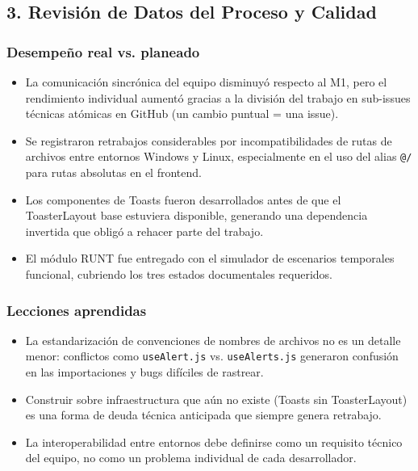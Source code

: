 \documentclass[11pt,a4paper]{article}
\begin{document}
\subsection{3. Revisión de Datos del Proceso y Calidad}

\subsubsection{Desempeño real vs. planeado}

\begin{itemize}[leftmargin=1.2em]
\item La comunicación sincrónica del equipo disminuyó respecto al M1, pero el rendimiento individual aumentó gracias a la división del trabajo en sub-issues técnicas atómicas en GitHub (un cambio puntual = una issue).
\item Se registraron retrabajos considerables por incompatibilidades de rutas de archivos entre entornos Windows y Linux, especialmente en el uso del alias \texttt{@/} para rutas absolutas en el frontend.
\item Los componentes de Toasts fueron desarrollados antes de que el ToasterLayout base estuviera disponible, generando una dependencia invertida que obligó a rehacer parte del trabajo.
\item El módulo RUNT fue entregado con el simulador de escenarios temporales funcional, cubriendo los tres estados documentales requeridos.
\end{itemize}

\subsubsection{Lecciones aprendidas}

\begin{itemize}[leftmargin=1.2em]
\item La estandarización de convenciones de nombres de archivos no es un detalle menor: conflictos como \texttt{useAlert.js} vs. \texttt{useAlerts.js} generaron confusión en las importaciones y bugs difíciles de rastrear.
\item Construir sobre infraestructura que aún no existe (Toasts sin ToasterLayout) es una forma de deuda técnica anticipada que siempre genera retrabajo.
\item La interoperabilidad entre entornos debe definirse como un requisito técnico del equipo, no como un problema individual de cada desarrollador.
\end{itemize}
\end{document}
